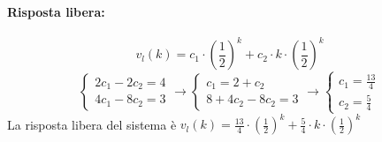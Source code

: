 \documentclass[a4paper,oneside,titlepage]{book}
\begin{document}
\paragraph{Risposta libera:}
\[ v_l(k) = c_1 \cdot \left( \frac{1}{2} \right)^k + c_2 \cdot k \cdot \left( \frac{1}{2} \right)^k \]
\[
\begin{cases}
2c_1 - 2c_2 = 4 \\
4c_1 - 8c_2 = 3
\end{cases}
\longrightarrow
\begin{cases}
c_1 = 2 + c_2 \\
8 + 4c_2 - 8c_2 = 3
\end{cases}
\longrightarrow
\begin{cases}
c_1 = \frac{13}{4} \\
c_2 = \frac{5}{4}
\end{cases}
\]
La risposta libera del sistema è $v_l(k) = \frac{13}{4} \cdot \left( \frac{1}{2} \right)^k + \frac{5}{4} \cdot k \cdot \left( \frac{1}{2} \right)^k$
\end{document}
